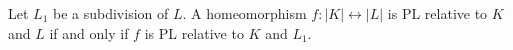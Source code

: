 Let $L_1$ be a subdivision of $L$. A homeomorphism $f: |K| \leftrightarrow |L|$ is PL relative to $K$ and $L$ if and only if $f$ is PL relative to $K$ and $L_1$.
